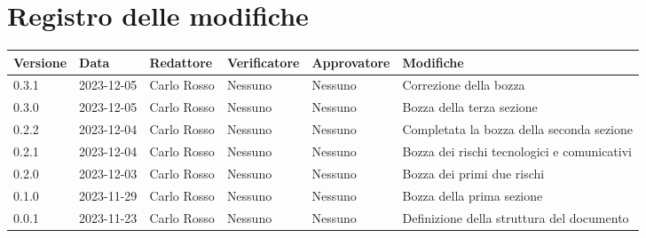 \section*{Registro delle modifiche}

\begin{table}[H]
	\centering
	\fontsize{10}{12}\selectfont
	\begin{tabularx}{\textwidth}{l|l|l|l|l|X}
		\textbf{Versione} & \textbf{Data} & \textbf{Redattore} & \textbf{Verificatore} & \textbf{Approvatore} & \textbf{Modifiche}                          \\
		\toprule
		0.3.1             & 2023-12-05    & Carlo Rosso        & Nessuno               & Nessuno              & Correzione della bozza                      \\
		0.3.0             & 2023-12-05    & Carlo Rosso        & Nessuno               & Nessuno              & Bozza della terza sezione                   \\
		0.2.2             & 2023-12-04    & Carlo Rosso        & Nessuno               & Nessuno              & Completata la bozza della seconda sezione   \\
		0.2.1             & 2023-12-04    & Carlo Rosso        & Nessuno               & Nessuno              & Bozza dei rischi tecnologici e comunicativi \\
		0.2.0             & 2023-12-03    & Carlo Rosso        & Nessuno               & Nessuno              & Bozza dei primi due rischi                  \\
		0.1.0             & 2023-11-29    & Carlo Rosso        & Nessuno               & Nessuno              & Bozza della prima sezione                   \\
		0.0.1             & 2023-11-23    & Carlo Rosso        & Nessuno               & Nessuno              & Definizione della struttura del documento   \\
		\bottomrule
	\end{tabularx}
\end{table}
